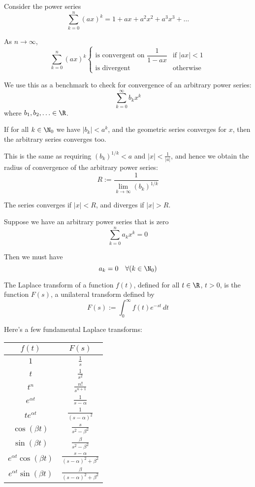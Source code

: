 Consider the power series
$$
	\sum_{k=0}^n(ax)^k=1+ax+a^2x^2+a^3x^3+\ldots
$$

As $n\to\infty$,
$$
	\sum_{k=0}^n(ax)^k\begin{cases}
		\text{is convergent on }\dfrac1{1-ax} & \text{if }|ax|<1 \\
		\text{is divergent}                   & \text{otherwise}
	\end{cases}
$$

We use this as a benchmark to check for convergence of an arbitrary
power series:
$$
	\sum_{k=0}^\infty b_kx^k
$$
where $b_1,b_2,\ldots\in\R$.

If for all $k\in\N_0$ we have $|b_k|<a^k$, and the geometric series
converges for $x$, then the arbitrary series converges too.

This is the same as requiring $(b_k)^{1/k}<a$ and $|x|<\frac1{|a|}$,
and hence we obtain the radius of convergence of the arbitrary power
series:
$$
	R:=\frac{1}{\displaystyle\lim_{k\to\infty}(b_k)^{1/k}}
$$

The series converges if $|x|<R$, and diverges if $|x|>R$.

\label{fe2e0f1}

Suppose we have an arbitrary power series that is zero
$$
	\sum_{k=0}^na_kx^k = 0
$$

Then we must have
$$
	a_k=0\quad\forall(k\in\N_0)
$$

\label{a7047c9}

The Laplace transform of a function $f(t)$, defined for all $t\in\R$,
$t>0$, is the function $F(s)$, a unilateral transform defined by
$$
	F(s):=\int_0^\infty f(t)e^{-st}\,dt
$$

Here's a few fundamental Laplace transforms:
\begin{center}
	\def\L#1{\mathcal L\{{#1}\}(s)}
	\def\a{\alpha}\def\b{\beta}
	\renewcommand{\arraystretch}{1.5}
	\begin{tabular}{|c|c|}
		\hline
		$f(t)$                   & $F(s)$                       \\\hline
		$1$                      & $\frac1s$                    \\\hline
		$t$                      & $\frac1{s^2}$                \\\hline
		$t^n$                    & $\frac{n!}{s^{n+1}}$         \\\hline
		$e^{\a t}$               & $\frac1{s-\a}$               \\\hline
		$te^{\a t}$              & $\frac1{(s-\a)^2}$           \\\hline
		$\cos(\b t)$             & $\frac{s}{s^2-\b^2}$         \\\hline
		$\sin(\b t)$             & $\frac{\b}{s^2-\b^2}$        \\\hline
		$e^{\alpha t}\cos(\b t)$ & $\frac{s-\a}{(s-\a)^2+\b^2}$ \\\hline
		$e^{\alpha t}\sin(\b t)$ & $\frac{\b}{(s-\a)^2+\b^2}$   \\\hline
	\end{tabular}
\end{center}

